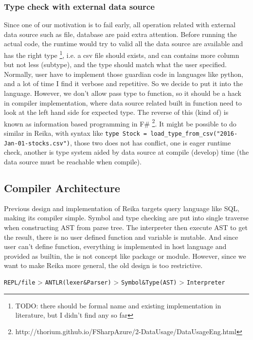 \documentclass{article}
\begin{document}
\subsubsection{Type check with external data source}
\label{subsubsec:type-check-with-extrenal-data-source}

Since one of our motivation is to fail early, all operation related with external data source such as file, database
are paid extra attention.
Before running the actual code, the runtime would try to valid all the data source are available and has the right type
\footnote{TODO: there should be formal name and existing implementation in literature, but I didn't find any so far},
i.e. a csv file should exists, and can contains more column but not less (subtype),
and the type should match what the user specified.
Normally, user have to implement those guardian code in languages like python, and a lot of time I find it verbose and repetitive.
So we decide to put it into the language.
However, we don't allow pass type to function, so it should be a hack in compiler implementation,
where data source related built in function need to look at the left hand side for expected type.
The reverse of this (kind of) is known as information based programming in F\# \footnote{http://thorium.github.io/FSharpAzure/2-DataUsage/DataUsageEng.html}.
It might be possible to do similar in Reika, with syntax like \texttt{type Stock = load\_type\_from\_csv("2016-Jan-01-stocks.csv")},
those two does not has conflict, one is eager runtime check, another is type system aided by data source at compile (develop) time
(the data source must be reachable when compile).

\subsection{Compiler Architecture}
\label{subsec:compiler-architecture}

Previous design and implementation of Reika targets query language like SQL, making its compiler simple.
Symbol and type checking are put into single traverse when constructing AST from parse tree.
The interpreter then execute AST to get the result, there is no user defined function and variable is mutable.
And since user can't define function, everything is implemented in host language and provided as builtin,
the is not concept like package or module.
However, since we want to make Reika more general, the old design is too restrictive.

\begin{center}
  \verb+REPL/file+ > \verb+ANTLR(lexer&Parser)+ > \verb+Symbol&Type(AST)+ > \verb+Interpreter+
\end{center}
\end{document}
